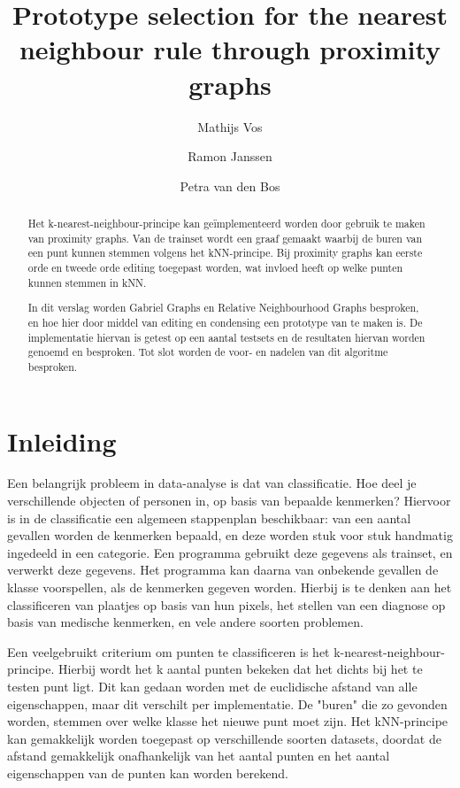 \documentclass{article}
\title{Prototype selection for the nearest neighbour rule through proximity graphs}
\author{Mathijs Vos \and Ramon Janssen \and Petra van den Bos}
\begin{document}
\maketitle
\tableofcontents
\newpage

\begin{abstract}
Het k-nearest-neighbour-principe kan ge\"implementeerd worden door gebruik te maken van proximity graphs. Van de trainset wordt een graaf gemaakt waarbij de buren van een punt kunnen stemmen volgens het kNN-principe. Bij proximity graphs kan eerste orde en tweede orde editing toegepast worden, wat invloed heeft op welke punten kunnen stemmen in kNN.

	In dit verslag worden Gabriel Graphs en Relative Neighbourhood Graphs besproken, en hoe hier door middel van editing en condensing een prototype van te maken is. De implementatie hiervan is getest op een aantal testsets en de resultaten hiervan worden genoemd en besproken. Tot slot worden de voor- en nadelen van dit algoritme besproken.
\end{abstract}

\section{Inleiding}
Een belangrijk probleem in data-analyse is dat van classificatie. Hoe deel je verschillende objecten of personen in, op basis van bepaalde kenmerken? Hiervoor is in de classificatie een algemeen stappenplan beschikbaar: van een aantal gevallen worden de kenmerken bepaald, en deze worden stuk voor stuk handmatig ingedeeld in een categorie. Een programma gebruikt deze gegevens als trainset, en verwerkt deze gegevens. Het programma kan daarna van onbekende gevallen de klasse voorspellen, als de kenmerken gegeven worden. Hierbij is te denken aan het classificeren van plaatjes op basis van hun pixels, het stellen van een diagnose op basis van medische kenmerken, en vele andere soorten problemen.

Een veelgebruikt criterium om punten te classificeren is het k-nearest-neighbour-principe. Hierbij wordt het k aantal punten bekeken dat het dichts bij het te testen punt ligt. Dit kan gedaan worden met de euclidische afstand van alle eigenschappen, maar dit verschilt per implementatie. De "buren" die zo gevonden worden, stemmen over welke klasse het nieuwe punt moet zijn. Het kNN-principe kan gemakkelijk worden toegepast op verschillende soorten datasets, doordat de afstand gemakkelijk onafhankelijk van het aantal punten en het aantal eigenschappen van de punten kan worden berekend.
\end{document}
